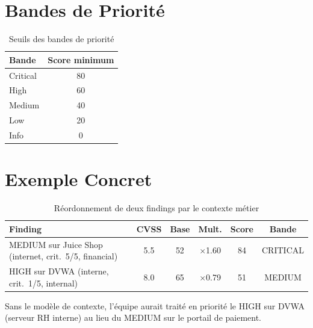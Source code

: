 \documentclass[12pt,a4paper]{report}
\begin{document}
\section{Bandes de Priorité}
\begin{table}[H]
\centering
\caption{Seuils des bandes de priorité}
\small
\begin{tabular}{l c}
\toprule
\textbf{Bande} & \textbf{Score minimum} \\
\midrule
Critical & 80 \\
High     & 60 \\
Medium   & 40 \\
Low      & 20 \\
Info     & 0 \\
\bottomrule
\end{tabular}
\end{table}

\section{Exemple Concret}
\begin{table}[H]
\centering
\caption{Réordonnement de deux findings par le contexte métier}
\small
\begin{tabularx}{\textwidth}{X c c c c c}
\toprule
\textbf{Finding} & \textbf{CVSS} & \textbf{Base} & \textbf{Mult.} & \textbf{Score} & \textbf{Bande} \\
\midrule
MEDIUM sur Juice Shop (internet, crit.\ 5/5, financial) & 5.5 & 52 & $\times$1.60 & 84 & CRITICAL \\
HIGH sur DVWA (interne, crit.\ 1/5, internal) & 8.0 & 65 & $\times$0.79 & 51 & MEDIUM \\
\bottomrule
\end{tabularx}
\end{table}

Sans le modèle de contexte, l'équipe aurait traité en priorité le HIGH sur DVWA (serveur RH interne) au lieu du MEDIUM sur le portail de paiement.
\end{document}
